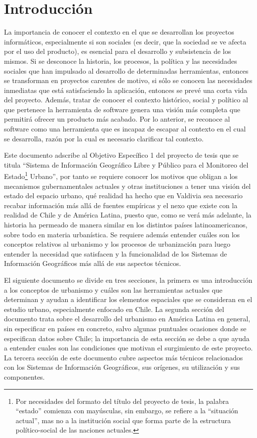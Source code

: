 \section{Introducción}

La importancia de conocer el contexto en el que se desarrollan los proyectos informáticos,
especialmente si son sociales (es decir, que la sociedad se ve afecta por el uso del producto), es
esencial para el desarrollo y subsistencia de los mismos. Si se desconoce la historia, los procesos,
la política y las necesidades sociales que han impulsado al desarrollo de determinadas herramientas,
entonces se transforman en proyectos carentes de motivo, si sólo se conocen las necesidades
inmediatas que está satisfaciendo la aplicación, entonces se prevé una corta vida del proyecto.
Además, tratar de conocer el contexto histórico, social y político al que pertenece la herramienta
de software genera una visión más completa que permitirá ofrecer un producto más acabado. Por lo
anterior, se reconoce al software como una herramienta que es incapaz de escapar al contexto en el
cual se desarrolla, razón por la cual es necesario clarificar tal contexto.

Este documento adscribe al Objetivo Específico 1 del proyecto de tesis que se titula ``Sistema de
Información Geográfico Libre y Público para el Monitoreo del Estado\footnote{Por necesidades del formato del título
del proyecto de tesis, la palabra ``estado'' comienza con mayúsculas, sin embargo, se refiere a la
``situación actual'', mas no a la institución social que forma parte de la estructura
político-social de las naciones actuales.} Urbano'', por tanto se requiere conocer los motivos que
obligan a los mecanismos gubernamentales actuales y otras instituciones a tener una visión del
estado del espacio urbano, qué realidad ha hecho que en Valdivia sea necesario recabar información
más allá de fuentes empíricas y el nexo que existe con la realidad de Chile y de América Latina,
puesto que, como se verá más adelante, la historia ha permeado de manera similar en los distintos
países latinoamericanos, sobre todo en materia urbanística. Se requiere además entender cuáles son
los conceptos relativos al urbanismo y los procesos de urbanización para luego entender la necesidad
que satisfacen y la funcionalidad de los Sistemas de Información Geográficos más allá de sus
aspectos técnicos.

El siguiente documento se divide en tres secciones, la primera es una introducción a los conceptos
de urbanismo y cuáles son las herramientas actuales que determinan y ayudan a identificar los
elementos espaciales que se consideran en el estudio urbano, especialmente enfocado en Chile. La
segunda sección del documento trata sobre el desarrollo del urbanismo en América Latina en general,
sin especificar en países en concreto, salvo algunas puntuales ocasiones donde se especifican datos
sobre Chile; la importancia de esta sección se debe a que ayuda a entender cuales son las
condiciones que motivan el surgimiento de este proyecto. La tercera sección de este documento cubre
aspectos más técnicos relacionados con los Sistemas de Información Geográficos, sus orígenes, su
utilización y sus componentes.

